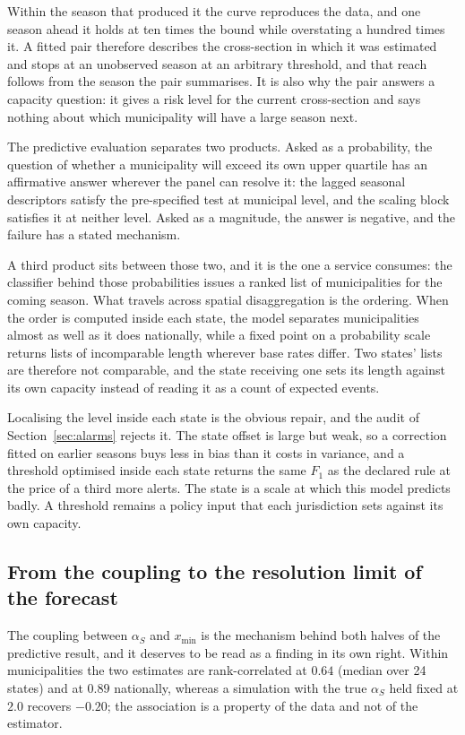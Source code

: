 \documentclass[english,10pt,b5paper]{article}
\begin{document}
Within the season that produced it the curve reproduces the data, and one season
ahead it holds at ten times the bound while overstating a hundred times it. A
fitted pair therefore describes the cross-section in which it was estimated and
stops at an unobserved season at an arbitrary threshold, and that reach follows
from the season the pair summarises. It is also why the pair answers a capacity
question: it gives a risk level for the current cross-section and says nothing
about which municipality will have a large season next.

The predictive evaluation separates two products. Asked as a probability, the
question of whether a municipality will exceed its own upper quartile has an
affirmative answer wherever the panel can resolve it: the lagged seasonal
descriptors satisfy the pre-specified test at municipal level, and the scaling
block satisfies it at neither level. Asked as a magnitude, the answer is negative,
and the failure has a stated mechanism.

A third product sits between those two, and it is the one a service consumes:
the classifier behind those probabilities issues a ranked list of
municipalities for the coming season. What travels across spatial
disaggregation is the ordering. When the order is computed inside each state,
the model separates municipalities almost as well as it does nationally, while
a fixed point on a probability scale returns lists of incomparable length
wherever base rates differ. Two states' lists are therefore not comparable,
and the state receiving one sets its length against its own capacity instead
of reading it as a count of expected events.

Localising the level inside each state is the obvious repair, and the audit of
Section~\ref{sec:alarms} rejects it. The state offset is large but weak, so a
correction fitted on earlier seasons buys less in bias than it costs in variance,
and a threshold optimised inside each state returns the same $F_1$ as the declared
rule at the price of a third more alerts. The state is a scale at which this model
predicts badly. A threshold remains a policy input that each jurisdiction sets
against its own capacity.

\subsection{From the coupling to the resolution limit of the forecast}

The coupling between $\alpha_S$ and $x_{\min}$ is the mechanism behind both halves
of the predictive result, and it deserves to be read as a finding in its own
right. Within municipalities the two estimates are
rank-correlated at $0.64$ (median over 24 states) and at $0.89$ nationally,
whereas a simulation with the true $\alpha_S$ held fixed at $2.0$ recovers
$-0.20$; the association is a property of the data and not of the estimator.
\end{document}
